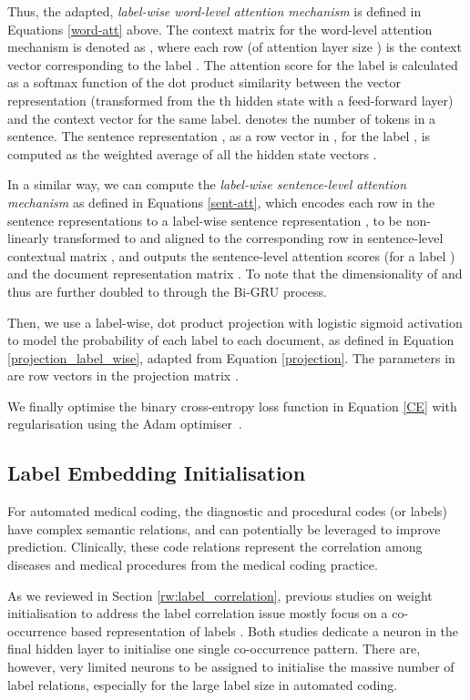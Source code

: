 \documentclass[final,5p,times,twocolumn]{elsarticle}
\begin{document}
Thus, the adapted, \textit{label-wise word-level attention mechanism} is defined in Equations \ref{word-att} above. The context matrix for the word-level attention mechanism is denoted as , where each row  (of attention layer size ) is the context vector corresponding to the label . The attention score  for the label  is calculated as a softmax function of the dot product similarity between the vector representation  (transformed from the th hidden state  with a feed-forward layer) and the context vector  for the same label.  denotes the number of tokens in a sentence. The sentence representation , as a row vector in , for the label , is computed as the weighted average of all the hidden state vectors .

In a similar way, we can compute the \textit{label-wise sentence-level attention mechanism} as defined in Equations \ref{sent-att}, which encodes each row  in the sentence representations  to a label-wise sentence representation , to be non-linearly transformed to  and aligned to the corresponding row  in sentence-level contextual matrix , and outputs the sentence-level attention scores  (for a label ) and the document representation matrix . To note that the dimensionality of  and thus  are further doubled to  through the Bi-GRU process.


Then, we use a label-wise, dot product projection with logistic sigmoid activation to model the probability of each label to each document, as defined in Equation \ref{projection_label_wise}, adapted from Equation \ref{projection}. The parameters in  are row vectors in the projection matrix .

We finally optimise the binary cross-entropy loss function in Equation \ref{CE} with  regularisation using the Adam optimiser~\cite{kingma2014}.

\subsection{Label Embedding Initialisation}
\label{le}
For automated medical coding, the diagnostic and procedural codes (or labels) have complex semantic relations, and can potentially be leveraged to improve prediction. Clinically, these code relations represent the correlation among diseases and medical procedures from the medical coding practice.

As we reviewed in Section \ref{rw:label_correlation}, previous studies on weight initialisation to address the label correlation issue mostly focus on a co-occurrence based representation of labels \cite{kurata-etal-2016-improved,baker-korhonen-2017-initializing}. Both studies dedicate a neuron in the final hidden layer to initialise one single co-occurrence pattern. There are, however, very limited neurons to be assigned to initialise the massive number of label relations, especially for the large label size in automated coding.
\end{document}
